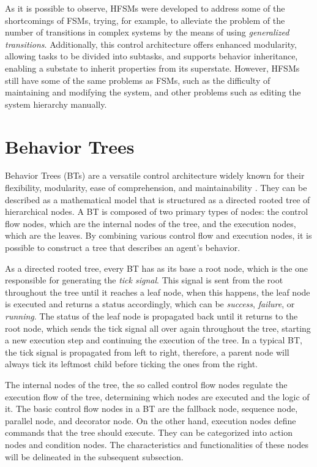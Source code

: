 As it is possible to observe, HFSMs were developed to address some of the shortcomings of FSMs, trying, for example, to alleviate the problem of the number of transitions in complex systems by the means of using \textit{generalized transitions}. Additionally, this control architecture offers enhanced modularity, allowing tasks to be divided into subtasks, and supports behavior inheritance, enabling a substate to inherit properties from its superstate. However, HFSMs still have some of the same problems as FSMs, such as the difficulty of maintaining and modifying the system, and other problems such as editing the system hierarchy manually.

\section{Behavior Trees}

Behavior Trees (BTs) are a versatile control architecture widely known for their flexibility, modularity, ease of comprehension, and maintainability \cite{BTsInRobotics}. They can be described as a mathematical model that is structured as a directed rooted tree of hierarchical nodes. A BT is composed of two primary types of nodes: the control flow nodes, which are the internal nodes of the tree, and the execution nodes, which are the leaves. By combining various control flow and execution nodes, it is possible to construct a tree that describes an agent's behavior.

As a directed rooted tree, every BT has as its base a root node, which is the one responsible for generating the \textit{tick signal}. This signal is sent from the root throughout the tree until it reaches a leaf node, when this happens, the leaf node is executed and returns a status accordingly, which can be \textit{success}, \textit{failure}, or \textit{running}. The status of the leaf node is propagated back until it returns to the root node, which sends the tick signal all over again throughout the tree, starting a new execution step and continuing the execution of the tree. In a typical BT, the tick signal is propagated from left to right, therefore, a parent node will always tick its leftmost child before ticking the ones from the right.

The internal nodes of the tree, the so called control flow nodes regulate the execution flow of the tree, determining which nodes are executed and the logic of it. The basic control flow nodes in a BT are the fallback node, sequence node, parallel node, and decorator node. On the other hand, execution nodes define commands that the tree should execute. They can be categorized into action nodes and condition nodes. The characteristics and functionalities of these nodes will be delineated in the subsequent subsection.

